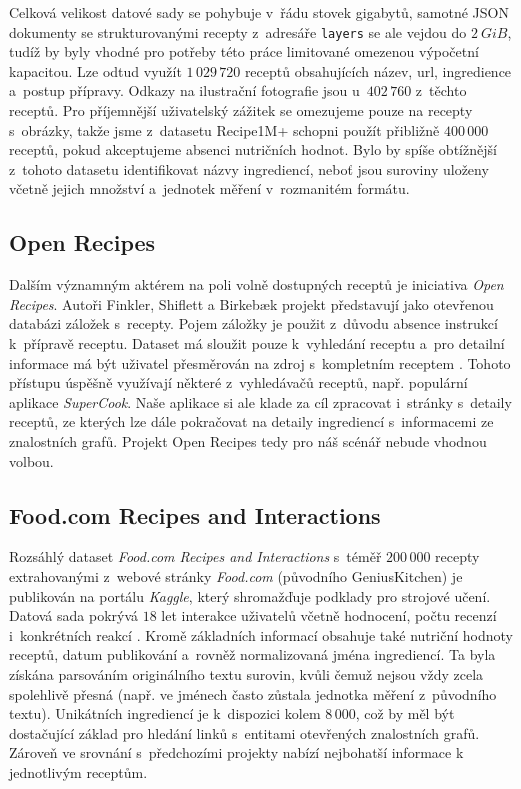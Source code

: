 Celková velikost datové sady se pohybuje v~řádu stovek gigabytů, samotné JSON dokumenty se strukturovanými recepty z~adresáře \texttt{layers} se ale vejdou do $2~GiB$, tudíž by byly vhodné pro potřeby této práce limitované omezenou výpočetní kapacitou. Lze odtud využít $1\,029\,720$ receptů obsahujících název, url, ingredience a~postup přípravy. Odkazy na ilustrační fotografie jsou u~$402\,760$ z~těchto receptů. Pro příjemnější uživatelský zážitek se omezujeme pouze na recepty s~obrázky, takže jsme z~datasetu Recipe1M+ schopni použít přibližně $400\,000$ receptů, pokud akceptujeme absenci nutričních hodnot. Bylo by spíše obtížnější z~tohoto datasetu identifikovat názvy ingrediencí, neboť jsou suroviny uloženy včetně jejich množství a~jednotek měření v~rozmanitém formátu.

\subsection{Open Recipes}

Dalším významným aktérem na poli volně dostupných receptů je iniciativa \emph{Open Recipes}. Autoři Finkler, Shiflett a Birkebæk projekt představují jako otevřenou databázi záložek s~recepty. Pojem záložky je použit z~důvodu absence instrukcí k~přípravě receptu. Dataset má sloužit pouze k~vyhledání receptu a~pro detailní informace má být uživatel přesměrován na zdroj s~kompletním receptem \citep{open-recipes}. Tohoto přístupu úspěšně využívají některé z~vyhledávačů receptů, např. populární aplikace \emph{SuperCook}. Naše aplikace si ale klade za cíl zpracovat i~stránky s~detaily receptů, ze kterých lze dále pokračovat na detaily ingrediencí s~informacemi ze znalostních grafů. Projekt Open Recipes tedy pro náš scénář nebude vhodnou volbou.

\subsection{Food.com Recipes and Interactions}

Rozsáhlý dataset \emph{Food.com Recipes and Interactions} s~téměř $200\,000$ recepty extrahovanými z~webové stránky \emph{Food.com} (původního GeniusKitchen) je publikován na portálu \emph{Kaggle}, který shromažďuje podklady pro strojové učení. Datová sada pokrývá $18$ let interakce uživatelů včetně hodnocení, počtu recenzí i~konkrétních reakcí \citep{shuyang_li_2019}. Kromě základních informací obsahuje také nutriční hodnoty receptů, datum publikování a~rovněž normalizovaná jména ingrediencí. Ta byla získána parsováním originálního textu surovin, kvůli čemuž nejsou vždy zcela spolehlivě přesná (např. ve jménech často zůstala jednotka měření z~původního textu). Unikátních ingrediencí je k~dispozici kolem $8\,000$, což by měl být dostačující základ pro hledání linků s~entitami otevřených znalostních grafů. Zároveň ve srovnání s~předchozími projekty nabízí nejbohatší informace k jednotlivým receptům.


